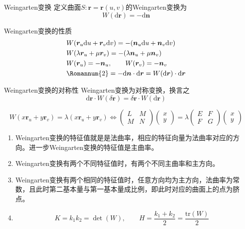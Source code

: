 \documentclass[lang = cn, scheme = chinese, thmcnt = section]{elegantbook}
\newcommand{\bs}{\boldsymbol}          %
\newcommand{\dd}{\mathrm{d}}           %
\begin{document}
\begin{definition}{Weingarten变换}
	定义曲面$S:\bs{r}=\bs{r}(u,v)$的Weingarten变换为%
	$$
	W(\dd\bs{r})=-\dd\bs{n}
	$$
\end{definition}

\begin{proposition}{Weingarten变换的性质}
	\begin{align*}
		& W(\bs{r}_u\dd u+\bs{r}_v\dd v)=-(\bs{n}_u\dd u+\bs{n}_v\dd v)\\
		& W(\lambda\bs{r}_u+\mu\bs{r}_v)=-(\lambda\bs{n}_u+\mu\bs{n}_v)\\
		& W(\bs{r}_u)=-\bs{n}_u,\qquad W(\bs{r}_v)=-\bs{n}_v\\
		& {\rm\Romannum{2}}=-\dd\bs{n}\cdot\dd\bs{r}=W(\dd\bs{r})\cdot\dd\bs{r}
	\end{align*}
\end{proposition}

\begin{proposition}{Weingarten变换的对称性}
	Weingarten变换为对称变换，换言之
	$$
	\dd\bs{r}\cdot W(\delta\bs{r})
	=\delta\bs{r}\cdot W(\dd\bs{r})
	$$
\end{proposition}

\begin{theorem}
	$$
	W(x\bs{r}_u+y\bs{r}_v)=\lambda(x\bs{r}_u+y\bs{r}_v)
	\iff
	\begin{pmatrix}
		L & M\\
		M & N
	\end{pmatrix}
	\begin{pmatrix}
		x\\y
	\end{pmatrix}
	=\lambda\begin{pmatrix}
		E & F\\
		F & G
	\end{pmatrix}
	\begin{pmatrix}
		x\\y
	\end{pmatrix}
	$$
\end{theorem}

\begin{corollary}
	\begin{enumerate}
		\item Weingarten变换的特征值就是是法曲率，相应的特征向量为法曲率对应的方向。进一步Weingarten变换的特征值是主曲率。
		\item Weingarten变换有两个不同特征值时，有两个不同主曲率和主方向。
		\item Weingarten变换有两个相同的特征值时，任意方向均为主方向，法曲率为常数，且此时第二基本量与第一基本量成比例，即此时对应的曲面上的点为脐点。
		\item %
		$$
		K=k_1k_2=\det(W),\qquad 
		H=\frac{k_1+k_2}{2}=\frac{\text{tr}(W)}{2}
		$$
	\end{enumerate}
\end{corollary}
\end{document}

